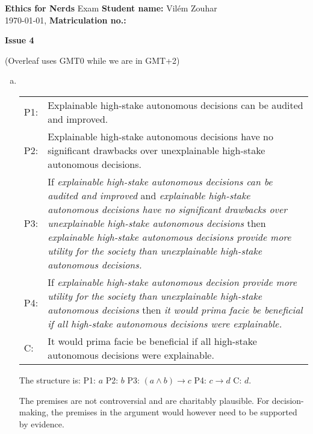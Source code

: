 \documentclass[a4paper, 11pt]{article}
\newcommand{\stdn}{} \newcommand{\studentname}[1]{\renewcommand{\stdn}{#1}}
\newcommand{\mtrk}{} \newcommand{\matriculationno}[1]{\renewcommand{\mtrk}{#1}}
\newcommand{\isnr}{} \newcommand{\issuenumber}[1]{\renewcommand{\isnr}{#1}}
\newcommand{\makeheader}{\textbf{Ethics for Nerds} Exam \hfill \textbf{Student name:} \stdn \\ \today, \currenttime \hfill \textbf{Matriculation no.:} \mtrk \par \textbf{\Large Issue \isnr}}
\begin{document}
\sffamily


\studentname{Vilém Zouhar} %
\matriculationno{} %
\issuenumber{4} %
\makeheader %


(Overleaf uses GMT0 while we are in GMT+2)

\begin{enumerate}[a)]
    \item
    \, \vspace{-0.65cm}
    
    \begin{tabular}{lp{12cm}}
    P1:& Explainable high-stake autonomous decisions can be audited and improved. \\
    P2:& Explainable high-stake autonomous decisions have no significant drawbacks over unexplainable high-stake autonomous decisions. \\
    P3:& If \emph{explainable high-stake autonomous decisions can be audited and improved} and \emph{explainable high-stake autonomous decisions have no significant drawbacks over unexplainable high-stake autonomous decisions} then \emph{explainable high-stake autonomous decisions provide more utility for the society than unexplainable high-stake autonomous decisions.} \\
    P4:& If \emph{explainable high-stake autonomous decision provide more utility for the society than unexplainable high-stake autonomous decisions} then \emph{it would prima facie be beneficial if all high-stake autonomous decisions were explainable.} \\
    \hline
    C:& It would prima facie be beneficial if all high-stake autonomous decisions were explainable.
    \end{tabular}
    
    \vspace{1cm}
    
    The structure is:
	P1: $a$ \qquad
	P2: $b$ \qquad
	P3: $(a \wedge b) \rightarrow c$ \qquad
	P4: $c \rightarrow d$ \qquad
	C: $d$.
	
	The premises are not controversial and are charitably plausible.
	For decision-making, the premises in the argument would however need to be supported by evidence.
\end{enumerate}

\end{document}
